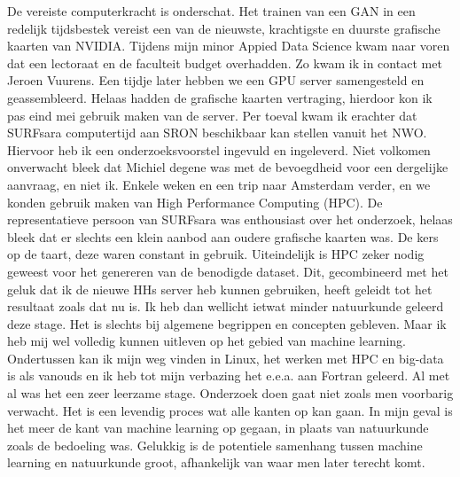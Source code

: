 De vereiste computerkracht is onderschat. Het trainen van een GAN in een redelijk tijdsbestek vereist een van de nieuwste, krachtigste en duurste grafische kaarten van NVIDIA.  Tijdens mijn minor Appied Data Science kwam naar voren dat een lectoraat en de faculteit budget overhadden. Zo kwam ik in contact met Jeroen Vuurens. Een tijdje later hebben we een GPU server samengesteld en geassembleerd. Helaas hadden de grafische kaarten vertraging, hierdoor kon ik pas eind mei gebruik maken van de server. Per toeval kwam ik erachter dat SURFsara computertijd aan SRON beschikbaar kan stellen vanuit het NWO. Hiervoor heb ik een onderzoeksvoorstel ingevuld en ingeleverd. Niet volkomen onverwacht bleek dat Michiel degene was met de bevoegdheid voor een dergelijke aanvraag, en niet ik. Enkele weken en een trip naar Amsterdam verder, en we konden gebruik maken van High Performance Computing (HPC). De representatieve persoon van SURFsara was enthousiast over het onderzoek, helaas bleek dat er slechts een klein aanbod aan oudere grafische kaarten was. De kers op de taart, deze waren constant in gebruik. Uiteindelijk is HPC zeker nodig geweest voor het genereren van de benodigde dataset. Dit, gecombineerd met het geluk dat ik de nieuwe HHs server heb kunnen gebruiken, heeft geleidt tot het resultaat zoals dat nu is.
Ik heb dan wellicht ietwat minder natuurkunde geleerd deze stage. Het is slechts bij algemene begrippen en concepten gebleven. Maar ik heb mij wel volledig kunnen uitleven op het gebied van machine learning. Ondertussen kan ik mijn weg vinden in Linux, het werken met HPC en big-data is als vanouds  en ik heb tot mijn verbazing het e.e.a. aan Fortran geleerd. Al met al was het een zeer leerzame stage. Onderzoek doen gaat niet zoals men voorbarig verwacht. Het is een levendig proces wat alle kanten op kan gaan. In mijn geval is het meer de kant van machine learning op gegaan, in plaats van natuurkunde zoals de bedoeling was. Gelukkig is de potentiele samenhang tussen machine learning en natuurkunde groot, afhankelijk van waar men later terecht komt. 
